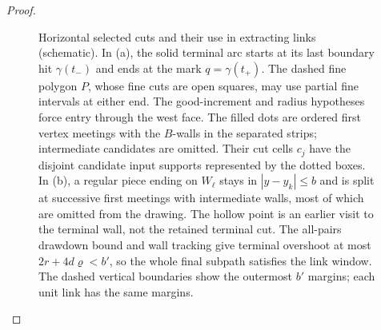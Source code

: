 \begin{proof}
\begin{figure}[t]
\caption{Horizontal selected cuts and their use in extracting links
(schematic). In (a), the solid terminal arc starts at its last boundary hit
$\gamma(t_-)$ and ends at the mark $q=\gamma(t_+)$. The dashed fine polygon
$P$, whose fine cuts are open squares, may use partial fine intervals at
either end. The good-increment and
radius hypotheses force entry through the west face. The filled dots are
ordered first vertex meetings with the $B$-walls in the separated strips;
intermediate candidates are omitted.
Their cut cells $c_j$ have the disjoint candidate input supports represented
by the dotted boxes. In (b), a regular
piece ending on $W_\ell$ stays in $|y-y_k|\le b$ and is split at successive first meetings with
intermediate walls, most of which are omitted from the drawing. The hollow
point is an earlier visit to the terminal
wall, not the retained terminal cut. The all-pairs drawdown bound and wall
tracking give terminal overshoot at most $2r+4d\varrho<b'$, so the whole final
subpath satisfies the link window. The dashed vertical boundaries show the
outermost $b'$ margins; each unit link has the same margins.}
\label{fig:horizontal-cuts-links}
\end{figure}


\end{proof}

